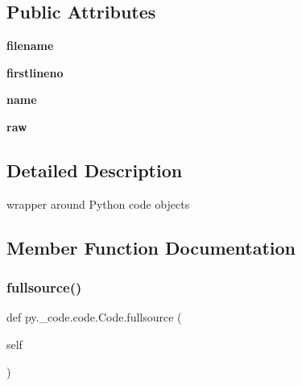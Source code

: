 \subsection*{Public Attributes}
\begin{DoxyCompactItemize}
\item 
\mbox{\label{classpy_1_1__code_1_1code_1_1_code_a7a407e337741efee158726ae779515e0}} 
{\bfseries filename}
\item 
\mbox{\label{classpy_1_1__code_1_1code_1_1_code_ad4ddde48727516833877dbdeec0fa384}} 
{\bfseries firstlineno}
\item 
\mbox{\label{classpy_1_1__code_1_1code_1_1_code_a77c32a3d6839205a0760ba92ef54d2dc}} 
{\bfseries name}
\item 
\mbox{\label{classpy_1_1__code_1_1code_1_1_code_a95984941853983c1c67bfb463aeff170}} 
{\bfseries raw}
\end{DoxyCompactItemize}


\subsection{Detailed Description}
\begin{DoxyVerb}wrapper around Python code objects \end{DoxyVerb}
 

\subsection{Member Function Documentation}
\mbox{\label{classpy_1_1__code_1_1code_1_1_code_ac0021a93e7f7438bbba8389ba07cc37b}} 
\subsubsection{\texorpdfstring{fullsource()}{fullsource()}}
{\footnotesize\ttfamily def py.\+\_\+code.\+code.\+Code.\+fullsource (\begin{DoxyParamCaption}\item[{}]{self }\end{DoxyParamCaption})}

